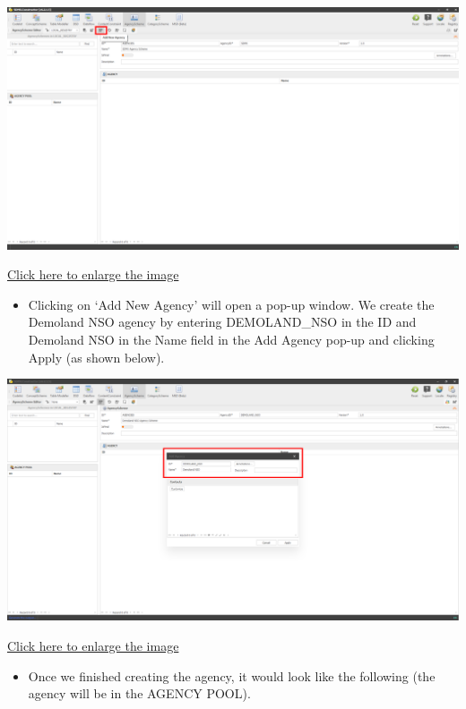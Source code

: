 \documentclass[
]{book}
\providecommand{\tightlist}{%
  \setlength{\itemsep}{0pt}\setlength{\parskip}{0pt}}
\begin{document}
\begin{center}\includegraphics[width=1\linewidth]{./images/image064} \end{center}

\href{images/image064.png}{Click here to enlarge the image}

\begin{itemize}
\tightlist
\item
  Clicking on `Add New Agency' will open a pop-up window. We create the Demoland NSO agency by entering DEMOLAND\_NSO in the ID and Demoland NSO in the Name field in the Add Agency pop-up and clicking Apply (as shown below).
\end{itemize}

\begin{center}\includegraphics[width=1\linewidth]{./images/image066} \end{center}

\href{images/image066.png}{Click here to enlarge the image}

\begin{itemize}
\tightlist
\item
  Once we finished creating the agency, it would look like the following (the agency will be in the AGENCY POOL).
\end{itemize}
\end{document}
